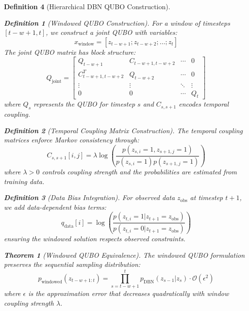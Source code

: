 \documentclass{article}
\newtheorem{theorem}{Theorem}
\newtheorem{definition}{Definition}
\begin{document}
\begin{definition}[Hierarchical DBN QUBO Construction]
\begin{definition}[Windowed QUBO Construction]
For a window of timesteps $[t-w+1, t]$, we construct a joint QUBO with variables:
\begin{equation}
x_{\text{window}} = [z_{t-w+1}; z_{t-w+2}; \ldots; z_t]
\end{equation}
The joint QUBO matrix has block structure:
\begin{equation}
Q_{\text{joint}} = \begin{bmatrix}
Q_{t-w+1} & C_{t-w+1,t-w+2} & \cdots & 0 \\
C_{t-w+1,t-w+2}^T & Q_{t-w+2} & \cdots & 0 \\
\vdots & \vdots & \ddots & \vdots \\
0 & 0 & \cdots & Q_t
\end{bmatrix}
\end{equation}
where $Q_s$ represents the QUBO for timestep $s$ and $C_{s,s+1}$ encodes temporal coupling.
\end{definition}

\begin{definition}[Temporal Coupling Matrix Construction]
The temporal coupling matrices enforce Markov consistency through:
\begin{equation}
C_{s,s+1}[i,j] = \lambda \log\left(\frac{p(z_{s,i} = 1, z_{s+1,j} = 1)}{p(z_{s,i} = 1)p(z_{s+1,j} = 1)}\right)
\end{equation}
where $\lambda > 0$ controls coupling strength and the probabilities are estimated from training data.
\end{definition}

\begin{definition}[Data Bias Integration]
For observed data $z_{\text{obs}}$ at timestep $t+1$, we add data-dependent bias terms:
\begin{equation}
q_{\text{data}}[i] = \log\left(\frac{p(z_{t,i} = 1 | z_{t+1} = z_{\text{obs}})}{p(z_{t,i} = 0 | z_{t+1} = z_{\text{obs}})}\right)
\end{equation}
ensuring the windowed solution respects observed constraints.
\end{definition}

\begin{theorem}[Windowed QUBO Equivalence]
The windowed QUBO formulation preserves the sequential sampling distribution:
\begin{equation}
p_{\text{windowed}}(z_{t-w+1:t}) = \prod_{s=t-w+1}^t p_{\text{DBN}}(z_{s-1} | z_s) \cdot \mathcal{O}(\epsilon^2)
\end{equation}
where $\epsilon$ is the approximation error that decreases quadratically with window coupling strength $\lambda$.
\end{theorem}


\end{definition}
\end{document}
